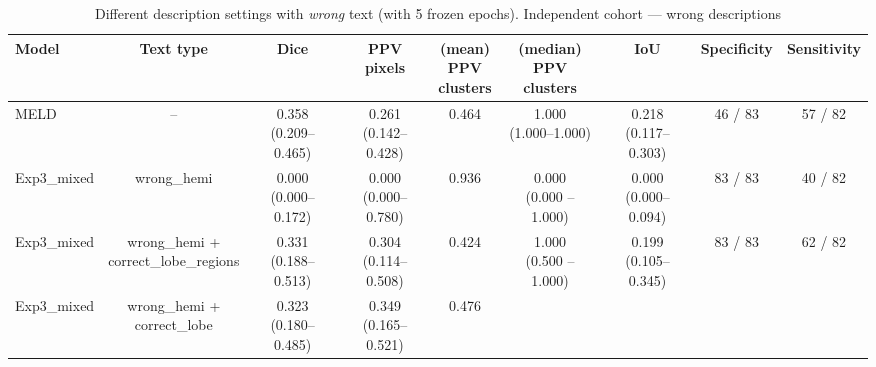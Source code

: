 \documentclass[a4paper,12pt]{article}
\begin{document}
\begin{table}[ht]
\centering
\tiny
\caption{Different description settings with \emph{wrong} text (with 5 frozen epochs). Independent cohort — wrong descriptions}
\label{tab:wrong_independent_cohort_mix_freeze}
\begin{tabular}{lcccccccc}
\textbf{Model} &
\textbf{Text type} &
\textbf{Dice} &
\makecell{\textbf{PPV}\\\textbf{pixels}} &
\makecell{\textbf{(mean)}\\\textbf{PPV}\\\textbf{clusters}} &
\makecell{\textbf{(median)}\\\textbf{PPV}\\\textbf{clusters}} &
\textbf{IoU} &
\textbf{Specificity} &
\textbf{Sensitivity} \\
\hline
MELD & -- &
\makecell{\colorbox{green!20}{0.358}\\(0.209--0.465)} &
\makecell{0.261\\(0.142--0.428)} &
0.464 &
\makecell{1.000\\(1.000--1.000)} &
\makecell{\colorbox{green!20}{0.218}\\(0.117--0.303)} &
46 / 83 & 
\colorbox{orange!20}{57 / 82} \\
\hline
Exp3\_mixed &
wrong\_hemi &
\makecell{0.000 \\ (0.000--0.172)} &
\makecell{0.000 \\ (0.000--0.780)} &
\colorbox{green!20}{0.936} &
\makecell{0.000 \\ (0.000 -- 1.000)} &
\makecell{0.000 \\ (0.000--0.094)} &
83 / 83 &
40 / 82 \\
\hline
Exp3\_mixed &
\makecell{wrong\_hemi + \\ correct\_lobe\_regions} &
\makecell{\colorbox{blue!20}{0.331} \\ (0.188--0.513)} &
\makecell{0.304 \\ (0.114--0.508)} &
0.424 &
\makecell{1.000 \\ (0.500 -- 1.000)} &
\makecell{\colorbox{blue!20}{0.199} \\ (0.105--0.345)} &
83 / 83 &
\colorbox{blue!20}{62 / 82} \\
\hline
Exp3\_mixed &
\makecell{wrong\_hemi + \\ correct\_lobe} &
\makecell{\colorbox{orange!20}{0.323} \\ (0.180--0.485)} &
\makecell{\colorbox{green!20}{0.349} \\ (0.165--0.521)} &
\colorbox{orange!20}{0.476} &

\end{tabular}
\end{table}
\end{document}
